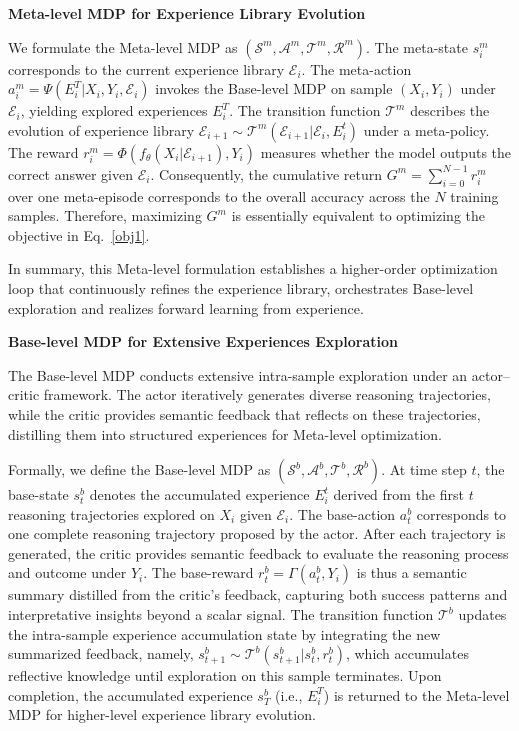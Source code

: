 \documentclass{article}
\begin{document}
\textbf{Meta-level MDP for Experience Library Evolution}

We formulate the Meta-level MDP as 
$(\mathcal{S}^{m}, \mathcal{A}^{m}, \mathcal{T}^{m}, \mathcal{R}^{m})$. 
The meta-state $s^{m}_i$ corresponds to the current experience library $\mathcal{E}_i$. 
The meta-action $a^{m}_i = \Psi({E^T_i}|X_i,Y_i,\mathcal{E}_i)$ invokes the Base-level MDP on sample $(X_i,Y_i)$ under $\mathcal{E}_i$, yielding explored experiences ${E^T_i}$.
The transition function $\mathcal{T}^{m}$ describes the evolution of experience library $\mathcal{E}_{i+1}\sim\mathcal{T}^{m}(\mathcal{E}_{i+1}|\mathcal{E}_i,{E^t_i})$ under a meta-policy.
The reward $r^{m}_i = \Phi(f_\theta(X_i|\mathcal{E}_{i+1}),Y_i)$ measures whether the model outputs the correct answer given $\mathcal{E}_i$.
Consequently, the cumulative return $G^{m} = \sum_{i=0}^{N-1} r^{m}_i$ over one meta-episode corresponds to the overall accuracy across the $N$ training samples.
Therefore, maximizing $G^{m}$ is essentially equivalent to optimizing the objective in Eq.~\ref{obj1}.

In summary, this Meta-level formulation establishes a higher-order optimization loop that continuously refines the experience library, orchestrates Base-level exploration and realizes forward learning from experience.

\textbf{Base-level MDP for Extensive Experiences Exploration}

The Base-level MDP conducts extensive intra-sample exploration under an actor–critic framework. The actor iteratively generates diverse reasoning trajectories, while the critic provides semantic feedback that reflects on these trajectories, distilling them into structured experiences for Meta-level optimization.

Formally, we define the Base-level MDP as $(\mathcal{S}^{b}, \mathcal{A}^{b}, \mathcal{T}^{b}, \mathcal{R}^{b})$.
At time step $t$, the base-state $s^{b}_t$ denotes the accumulated experience ${E^t_i}$ derived from the first $t$ reasoning trajectories explored on $X_i$ given $\mathcal{E}_i$.
The base-action $a^{b}_{t}$ corresponds to one complete reasoning trajectory proposed by the actor.
After each trajectory is generated, the critic provides semantic feedback to evaluate the reasoning process and outcome under $Y_i$. 
The base-reward $r^{b}_{t}=\Gamma(a^{b}_t,Y_i)$ is thus a semantic summary distilled from the critic’s feedback, capturing both success patterns and interpretative insights beyond a scalar signal.
The transition function $\mathcal{T}^{b}$ updates the intra-sample experience accumulation state by integrating the new summarized feedback, namely, $s^{b}_{t+1} \sim \mathcal{T}^{b}(s^{b}_{t+1}|s^{b}_{t},r^{b}_{t})$, which accumulates reflective knowledge until exploration on this sample terminates.
Upon completion, the accumulated experience $s^{b}_T$ (i.e., ${E^T_i}$) is returned to the Meta-level MDP for higher-level experience library evolution.
\end{document}
